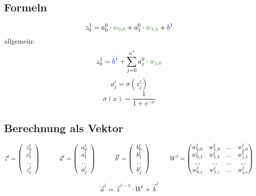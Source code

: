 \documentclass{article}
\begin{document}
\subsection{Formeln}
\[ z_0^1 = a_0^0 \cdot \textcolor{OliveGreen}{w_{0,0}} + a_1^0 \cdot \textcolor{OliveGreen}{w_{1,0}} + \textcolor{blue}{b^1} \]
allgemein:
\[  z_0^1 = \textcolor{blue}{b^1} + \sum_{j=0}^{n^1} a_j^0 \cdot \textcolor{OliveGreen}{w_{j,0}}  \]
\[a_j^l = \sigma(z_j^l)\]
\[\sigma(x) = \frac{1}{1 + e^{-x}}\]


\pagebreak
\subsection{Berechnung als Vektor}
\[ \vec{z}^l = \left(\begin{array}{c} z_0^l \\ z_1^l \\ ... \\ z_j^l \end{array}\right) 
\kern 30pt
\vec{a}^l = \left(\begin{array}{c} a_0^l \\ a_1^l \\ ... \\ a_j^l \end{array}\right) 
\kern 30pt
\vec{b}^l = \left(\begin{array}{c} b_0^l \\ b_1^l \\ ... \\ b_j^l \end{array}\right) 
\kern 30pt
W^l = \begin{pmatrix}
    w_{0,0}^l & w_{1,0}^l & ... & w_{j,0}^l \\
    w_{0,1}^l & w_{1,1}^l & ... & w_{j,1}^l \\
    ... & ... & ... & ... \\
    w_{0,i}^l & w_{1,i}^l & ... & w_{j,i}^l
\end{pmatrix} \]

\[ \vec{a}^l = \vec{z}^{l-1} \cdot W^l + \vec{b}^l \]
\end{document}
